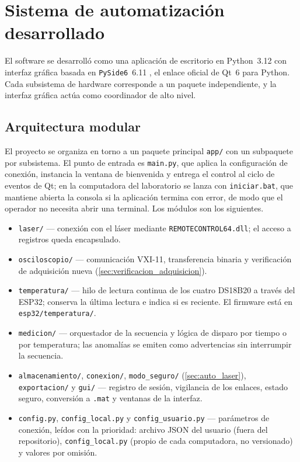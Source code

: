 \section{Sistema de automatización desarrollado}
\label{sec:sistema}

El software se desarrolló como una aplicación de escritorio en
Python~3.12 con interfaz gráfica basada en \texttt{PySide6}~6.11
\cite{PySide6}, el
enlace oficial de Qt~6 para Python. Cada subsistema de hardware
corresponde a un paquete independiente, y la interfaz gráfica actúa
como coordinador de alto nivel.

\subsection{Arquitectura modular}
\label{sec:arquitectura}

El proyecto se organiza en torno a un paquete principal \texttt{app/}
con un subpaquete por subsistema. El punto de entrada es
\texttt{main.py}, que aplica la configuración de conexión, instancia la
ventana de bienvenida y entrega el control al ciclo de eventos de Qt;
en la computadora del laboratorio se lanza con \texttt{iniciar.bat},
que mantiene abierta la consola si la aplicación termina con error, de
modo que el operador no necesita abrir una terminal. Los módulos son
los siguientes.

{\sloppy
\begin{itemize}
  \item \texttt{laser/} — conexión con el láser mediante
    \texttt{REMOTECONTROL64.dll}; el acceso a registros queda
    encapsulado.
  \item \texttt{osciloscopio/} — comunicación VXI-11, transferencia
    binaria y verificación de adquisición nueva
    (\cref{sec:verificacion_adquisicion}).
  \item \texttt{temperatura/} — hilo de lectura continua de los cuatro
    DS18B20 a través del ESP32; conserva la última lectura e indica si
    es reciente. El firmware está en \texttt{esp32/temperatura/}.
  \item \texttt{medicion/} — orquestador de la secuencia y lógica de
    disparo por tiempo o por temperatura; las anomalías se emiten como
    advertencias sin interrumpir la secuencia.
  \item \texttt{almacenamiento/}, \texttt{conexion/},
    \texttt{modo\_seguro/} (\cref{sec:auto_laser}),
    \texttt{exportacion/} y \texttt{gui/} — registro de sesión,
    vigilancia de los enlaces, estado seguro, conversión a \texttt{.mat}
    y ventanas de la interfaz.
  \item \texttt{config.py}, \texttt{config\_local.py} y
    \texttt{config\_usuario.py} — parámetros de conexión, leídos con la
    prioridad: archivo JSON del usuario (fuera del repositorio),
    \texttt{config\_local.py} (propio de cada computadora, no
    versionado) y valores por omisión.
\end{itemize}
\par}

